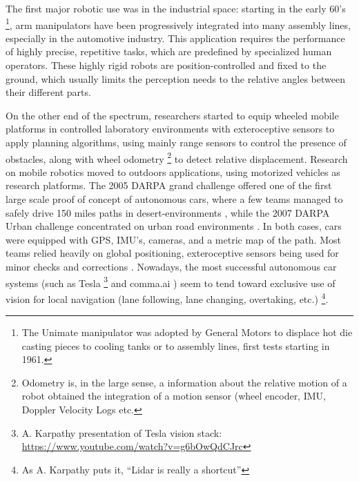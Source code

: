 The first major robotic use was in the industrial space: 
starting in the early 60's \footnote{The Unimate manipulator was adopted by General Motors to displace hot die casting pieces to cooling tanks or to assembly lines, first tests starting in 1961.}, 
arm manipulators have been progressively integrated into many assembly lines, especially in the automotive industry. 
This application requires the performance of highly precise, repetitive tasks, which are predefined by specialized human operators.
These highly rigid robots are position-controlled and fixed to the ground, which usually limits the perception needs to the relative angles between their different parts.

On the other end of the spectrum, researchers started to equip wheeled mobile platforms in controlled laboratory environments with exteroceptive sensors 
\cite{Nilsson1984ShakeyTR, chatila1985position} to apply planning algorithms, using mainly range sensors to control the presence of obstacles, along with wheel odometry \footnote{Odometry is, in the large sense, a information about the relative motion of a robot obtained the integration of a motion sensor (wheel encoder, IMU, Doppler Velocity Logs etc.}
to detect relative displacement. 
Research on mobile robotics moved to outdoors applications, using motorized vehicles as research platforms. The 2005 DARPA grand challenge
offered one of the first large scale proof of concept of autonomous cars, where a few teams managed to safely drive 150 miles paths in desert-environments 
\cite{thrun2006stanley}, while the 2007 DARPA Urban challenge concentrated on urban road environments \cite{urmson2008autonomous}. In both cases, cars were 
equipped with GPS, IMU's, cameras, and a metric map of the path. Most teams relied heavily on global positioning, exteroceptive sensors being used for 
minor checks and corrections \cite{hillel2014recent}. Nowadays, the most successful autonomous car systems (such as Tesla \footnote{A. Karpathy presentation of Tesla vision stack: \url{https://www.youtube.com/watch?v=g6bOwQdCJrc}} and comma.ai \cite{comma2020openpilot}) 
seem to tend toward exclusive use of vision for local navigation (lane following, lane changing, overtaking, etc.) \footnote{As A. Karpathy puts it, “Lidar is really a shortcut”}. 


